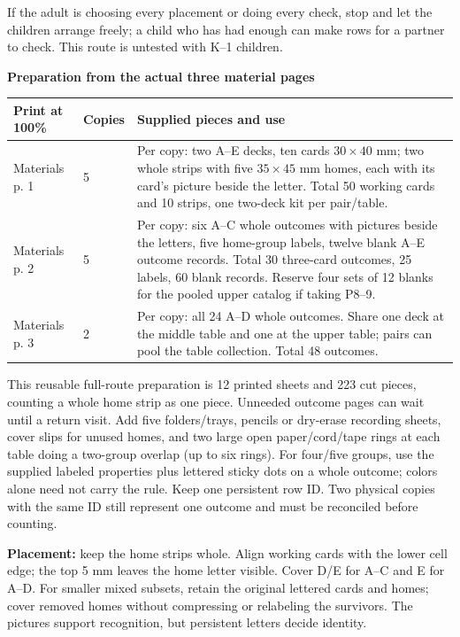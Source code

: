 \documentclass[11pt]{article}
\newcommand{\heading}[1]{\par\textbf{\large #1}\par}
\newcommand{\guidepage}{\newpage}
\begin{document}
If the adult is choosing every placement or doing every check, stop and let the children arrange freely; a child who has had enough can make rows for a partner to check. This route is untested with K--1 children.

\guidepage
\heading{Preparation from the actual three material pages}

\begin{tabularx}{\linewidth}{@{}p{27mm}p{19mm}X@{}}\toprule
Print at 100\% & Copies & Supplied pieces and use\\\midrule
Materials p. 1 & 5 & Per copy: two A--E decks, ten cards $30\times40$ mm; two whole strips with five $35\times45$ mm homes, each with its card's picture beside the letter. Total 50 working cards and 10 strips, one two-deck kit per pair/table.\\
Materials p. 2 & 5 & Per copy: six A--C whole outcomes with pictures beside the letters, five home-group labels, twelve blank A--E outcome records. Total 30 three-card outcomes, 25 labels, 60 blank records. Reserve four sets of 12 blanks for the pooled upper catalog if taking P8--9.\\
Materials p. 3 & 2 & Per copy: all 24 A--D whole outcomes. Share one deck at the middle table and one at the upper table; pairs can pool the table collection. Total 48 outcomes.\\\bottomrule
\end{tabularx}

This reusable full-route preparation is 12 printed sheets and 223 cut pieces, counting a whole home strip as one piece. Unneeded outcome pages can wait until a return visit. Add five folders/trays, pencils or dry-erase recording sheets, cover slips for unused homes, and two large open paper/cord/tape rings at each table doing a two-group overlap (up to six rings). For four/five groups, use the supplied labeled properties plus lettered sticky dots on a whole outcome; colors alone need not carry the rule. Keep one persistent row ID. Two physical copies with the same ID still represent one outcome and must be reconciled before counting.

\textbf{Placement:} keep the home strips whole. Align working cards with the lower cell edge; the top 5 mm leaves the home letter visible. Cover D/E for A--C and E for A--D. For smaller mixed subsets, retain the original lettered cards and homes; cover removed homes without compressing or relabeling the survivors. The pictures support recognition, but persistent letters decide identity.
\end{document}
